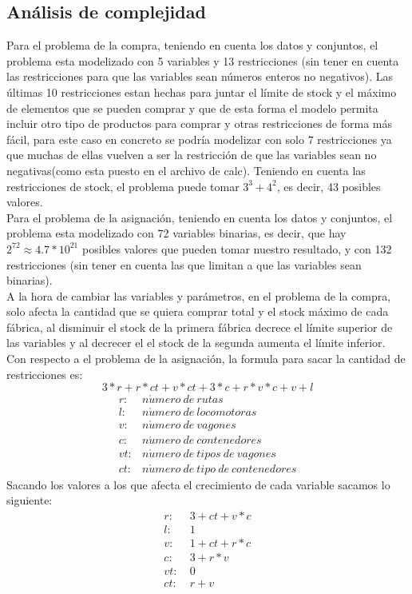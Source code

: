 \documentclass[11pt,spanish]{article}
\begin{document}
		\subsection{Análisis de complejidad}
		Para el problema de la compra, teniendo en cuenta los datos y conjuntos, el problema esta modelizado con 5 variables y 13 restricciones (sin tener en cuenta las restricciones para que las variables sean números enteros no negativos). Las últimas 10 restricciones estan hechas para juntar el límite de stock y el máximo de elementos que se pueden comprar y que de esta forma el modelo permita incluir otro tipo de productos para comprar y otras restricciones de forma más fácil, para este caso en concreto se podría modelizar con solo 7 restricciones ya que muchas de ellas vuelven a ser la restricción de que las variables sean no negativas(como esta puesto en el archivo de calc). Teniendo en cuenta las restricciones de stock, el problema puede tomar $3^3+4^2$, es decir, 43 posibles valores.\\
		Para el problema de la asignación, teniendo en cuenta los datos y conjuntos, el problema esta modelizado con 72 variables binarias, es decir, que hay $2^{72}\approx4.7*10^{21}$ posibles valores que pueden tomar nuestro resultado, y con 132 restricciones (sin tener en cuenta las que limitan a que las variables sean binarias).\\
		A la hora de cambiar las variables y parámetros, en el problema de la compra, solo afecta la cantidad que se quiera comprar total y el stock máximo de cada fábrica, al disminuir el stock de la primera fábrica decrece el límite superior de las variables y al decrecer el el stock de la segunda aumenta el límite inferior. Con respecto a el problema de la asignación, la formula para sacar la cantidad de restricciones es: 
		$$
		3*r+r*ct+v*ct+3*c+r*v*c+v+l
		$$
		\begin{align*}
			r:& n\acute{u}mero\ de\ rutas\\
			l:& n\acute{u}mero\ de\ locomotoras\\
			v:& n\acute{u}mero\ de\ vagones\\
			c:& n\acute{u}mero\ de\ contenedores\\
			vt:& n\acute{u}mero\ de\ tipos\ de\ vagones\\
			ct:& n\acute{u}mero\ de\ tipo\ de\ contenedores
		\end{align*}
		Sacando los valores a los que afecta el crecimiento de cada variable sacamos lo siguiente:
		\begin{align*}
			r:&\ 3+ct+v*c\\
			l:&\ 1\\
			v:&\ 1+ct+r*c\\
			c:&\ 3+r*v\\
			vt:&\ 0\\
			ct:&\ r+v
		\end{align*}
\end{document}
